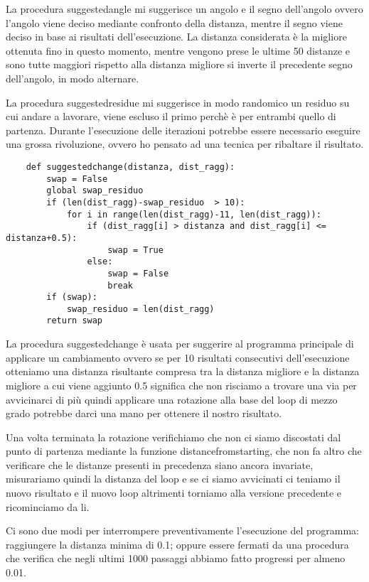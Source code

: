 La procedura suggestedangle mi suggerisce un angolo e il segno dell'angolo ovvero l'angolo viene deciso mediante confronto della distanza, mentre il segno viene 
deciso in base ai risultati dell'esecuzione. La distanza considerata è la migliore ottenuta fino in questo momento, mentre vengono prese le ultime 50 distanze e sono
tutte maggiori rispetto alla distanza migliore si inverte il precedente segno dell'angolo, in modo alternare. 

La procedura suggestedresidue mi suggerisce in modo randomico un residuo su cui andare a lavorare, viene escluso il primo perchè è per entrambi quello di partenza. 
Durante l'esecuzione delle iterazioni potrebbe essere necessario eseguire una grossa rivoluzione, ovvero ho pensato ad una tecnica per ribaltare il risultato.
\begin{verbatim}
    def suggestedchange(distanza, dist_ragg):
        swap = False
        global swap_residuo
        if (len(dist_ragg)-swap_residuo  > 10):
            for i in range(len(dist_ragg)-11, len(dist_ragg)):
                if (dist_ragg[i] > distanza and dist_ragg[i] <= distanza+0.5):
                    swap = True
                else:
                    swap = False
                    break
        if (swap):
            swap_residuo = len(dist_ragg)
        return swap
\end{verbatim}
La procedura suggestedchange è usata per suggerire al programma principale di applicare un cambiamento ovvero se per 10 risultati consecutivi dell'esecuzione otteniamo
una distanza risultante compresa tra la distanza migliore e la distanza migliore a cui viene aggiunto 0.5 significa che non risciamo a trovare una via per avvicinarci di 
più quindi applicare una rotazione alla base del loop di mezzo grado potrebbe darci una mano per ottenere il nostro risultato. 

Una volta terminata la rotazione verifichiamo che non ci siamo discostati dal punto di partenza mediante la funzione distancefromstarting, che non fa altro che verificare
che le distanze presenti in precedenza siano ancora invariate, misurariamo quindi la distanza del loop e se ci siamo avvicinati ci teniamo il nuovo risultato e il nuovo 
loop altrimenti torniamo alla versione precedente e ricominciamo da li. 

Ci sono due modi per interrompere preventivamente l'esecuzione del programma: raggiungere la distanza minima di 0.1; oppure essere fermati da una procedura che verifica
che negli ultimi 1000 passaggi abbiamo fatto progressi per almeno 0.01.